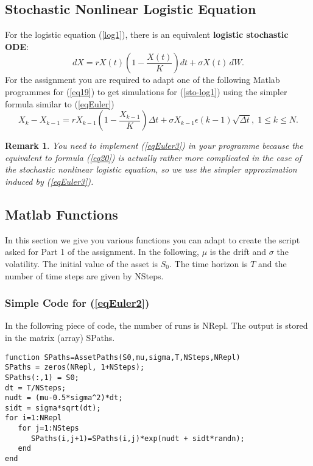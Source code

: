 \documentclass[12pt]{article}
\def\Dd{\Delta}
\def\eps{\epsilon}
\newcommand{\be}{\begin{equation}}
\newcommand{\ee}{\end{equation}}
\newtheorem{remark}[theorem]{Remark}
\begin{document}
\subsection{Stochastic Nonlinear Logistic Equation}

For the logistic equation (\ref{log1}), there is an equivalent {\bf\red logistic stochastic ODE}:
\be\label{sto-log1} dX=rX(t)\left(1-\frac{X(t)}{K}\right)dt+\sigma X(t)\,dW. \ee
For the assignment you are required to adapt one of the following Matlab programmes for (\ref{eq19})
to get simulations for (\ref{sto-log1}) using the simpler formula similar to (\ref{eqEuler})
\be\label{eqEuler3} X_k-X_{k-1}=rX_{k-1}\left(1-\frac{X_{k-1}}{K}\right)\Dd t
+\sigma X_{k-1}\eps(k-1)\sqrt{\Dd t},\;1\leq k\leq N. \ee

\begin{remark} You need to implement (\ref{eqEuler3}) in your programme because the equivalent to formula (\ref{eq20}) is actually rather more complicated in the case of the stochastic nonlinear logistic equation, so we use the simpler approximation induced by (\ref{eqEuler3}). \end{remark}


\subsection{Matlab Functions}\label{matlab_prog}

In this section we give you various functions you can adapt to create the script asked for Part 1
of the assignment. In the following, $\mu$ is the drift and $\sigma$ the volatility. The initial value
of the asset is $S_0$. The time horizon is $T$ and the number of time steps are given by NSteps.

\subsubsection{Simple Code for (\ref{eqEuler2})}

In the following piece of code, the number of runs is NRepl. The output is stored in the matrix (array) SPaths.

\begin{verbatim}
function SPaths=AssetPaths(S0,mu,sigma,T,NSteps,NRepl)
SPaths = zeros(NRepl, 1+NSteps);
SPaths(:,1) = S0;
dt = T/NSteps;
nudt = (mu-0.5*sigma^2)*dt;
sidt = sigma*sqrt(dt);
for i=1:NRepl
   for j=1:NSteps
      SPaths(i,j+1)=SPaths(i,j)*exp(nudt + sidt*randn);
   end
end
\end{verbatim}
\end{document}
